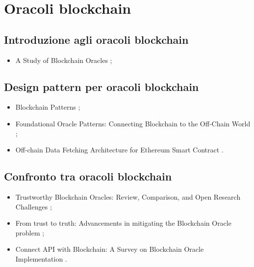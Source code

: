 \section*{Oracoli blockchain}

\subsection*{Introduzione agli oracoli blockchain}
\begin{itemize}

\item A Study of Blockchain Oracles \cite{beniiche2020oracle};

\end{itemize}

\subsection*{Design pattern per oracoli blockchain}
\begin{itemize}

\item Blockchain Patterns \cite{xu2019blockchainpatterns};

\item Foundational Oracle Patterns: Connecting Blockchain to the Off-Chain World \cite{wohrer2020oraclepatterns};

\item Off-chain Data Fetching Architecture for Ethereum Smart Contract \cite{liu2020oraclepatterns}.

\end{itemize}

\subsection*{Confronto tra oracoli blockchain}
\begin{itemize}

\item Trustworthy Blockchain Oracles: Review, Comparison, and Open Research Challenges \cite{albreiki2020oraclescompared};

\item From trust to truth: Advancements in mitigating the Blockchain Oracle problem \cite{hassan2023oraclescompared};

\item Connect API with Blockchain: A Survey on Blockchain Oracle Implementation \cite{pasdar2023oraclescompared}.

\end{itemize}

